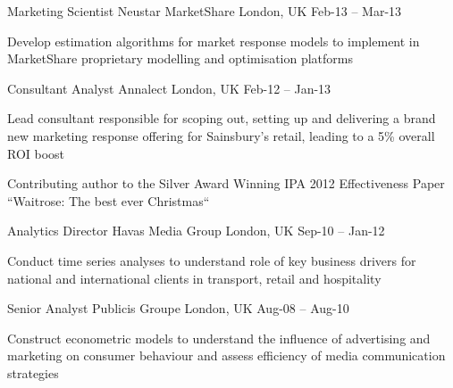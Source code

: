 \begin{cventries}
  \cventry
    {Marketing Scientist} %
    {Neustar MarketShare} %
    {London, UK} %
    {Feb-13 – Mar-13} %
    {
      \begin{cvitems} %
        \item {Develop estimation algorithms for market response models to implement in MarketShare proprietary modelling and optimisation platforms}
      \end{cvitems}
      }
    
  \cventry
    {Consultant Analyst} %
    {Annalect} %
    {London, UK} %
    {Feb-12 – Jan-13} %
    {
      \begin{cvitems} %
        \item {Lead consultant responsible for scoping out, setting up and delivering a brand new marketing response offering for Sainsbury’s retail, leading to a 5\% overall ROI boost}
        \item {Contributing author to the Silver Award Winning IPA 2012 Effectiveness Paper “Waitrose: The best ever Christmas“}
      \end{cvitems}
    }
    
  \cventry
    {Analytics Director} %
    {Havas Media Group} %
    {London, UK} %
    {Sep-10 – Jan-12} %
    {
      \begin{cvitems} %
        \item {Conduct time series analyses to understand role of key business drivers for national and international clients in transport, retail and hospitality}
      \end{cvitems}
    }

  \cventry
    {Senior Analyst} %
    {Publicis Groupe} %
    {London, UK} %
    {Aug-08 – Aug-10} %
    {
      \begin{cvitems} %
        \item {Construct econometric models to understand the influence of advertising and marketing on consumer behaviour and assess efficiency of media communication strategies}
      \end{cvitems}
    }


\end{cventries}
